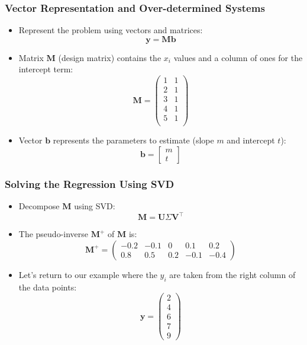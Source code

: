\documentclass[aspectratio=169]{beamer}
\begin{document}
\begin{frame}
\frametitle{Vector Representation and Over-determined Systems}
\begin{itemize}
    \item Represent the problem using vectors and matrices:
    \[
    \mathbf{y} = \mathbf{M} \mathbf{b}
    \]\pause
    \item Matrix \( \mathbf{M} \) (design matrix) contains the \( x_i \) values and a column of ones for the intercept term:
    \[
    \mathbf{M} = \begin{pmatrix}
    1 & 1 \\
    2 & 1 \\
    3 & 1 \\
    4 & 1 \\
    5 & 1 \\
    \end{pmatrix}
    \]\pause
    \item Vector \( \mathbf{b} \) represents the parameters to estimate (slope \( m \) and intercept \( t \)):
    \[
    \mathbf{b} = \begin{bmatrix} m \\ t \end{bmatrix}
    \]
\end{itemize}
\end{frame}

\begin{frame}
\frametitle{Solving the Regression Using SVD}

\begin{itemize}
    \item Decompose \( \mathbf{M} \) using SVD:
    \[
    \mathbf{M} = \mathbf{U} \Sigma \mathbf{V}^\top
    \]\pause
    \item The pseudo-inverse \( \mathbf{M}^+ \) of \( \mathbf{M} \) is:
    \[
    \mathbf{M}^+ = \begin{pmatrix}
    -0.2 & -0.1 & 0 & 0.1 & 0.2 \\
    0.8 & 0.5 & 0.2 & -0.1 & -0.4
    \end{pmatrix}
    \]\pause
    \item Let's return to our example where the \( {y_i} \) are taken from the right column of the data points:
    \[
    \mathbf{y} = \begin{pmatrix}
    2 \\
    4 \\
    6 \\
    7 \\
    9
    \end{pmatrix}
    \]
\end{itemize}
\end{frame}
\end{document}
